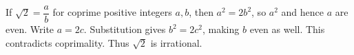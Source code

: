 If $\sqrt2=\dfrac{a}{b}$ for coprime positive integers $a,b$, then $a^2=2b^2$, so $a^2$ and hence $a$ are even. Write $a=2c$. Substitution gives $b^2=2c^2$, making $b$ even as well. This contradicts coprimality. Thus $\sqrt2$ is irrational.
